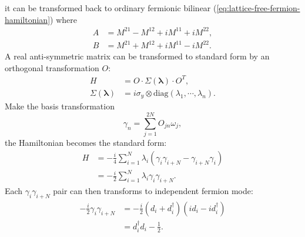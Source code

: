 it can be transformed back to ordinary fermionic bilinear (\ref{eq:lattice-free-fermion-hamiltonian}) where
\begin{equation}
\begin{aligned}
	A &= M^{21} - M^{12} + i M^{11} + i M^{22}, \\
	B &= M^{21} + M^{12} + i M^{11} - i M^{22}.
	\label{eq:lattice-majorana-bilinear-to-fermion}
\end{aligned}
\end{equation}
A real anti-symmetric matrix can be transformed to standard form by an orthogonal transformation $O$:
\begin{equation}
\begin{aligned}
	H &= O \cdot \Sigma(\bm \lambda) \cdot O^T, \\
	\Sigma(\bm \lambda) &= i\sigma_y \otimes \mathrm{diag}(\lambda_1,\cdots,\lambda_n).
\end{aligned}
\end{equation}
Make the basis transformation
\begin{equation}
	\gamma_n = \sum_{j=1}^{2N} O_{jn} \omega_j,
\end{equation}
the Hamiltonian becomes the standard form:
\begin{equation}
\begin{aligned}
	H &= -\frac{i}{4} \sum_{i=1}^N \lambda_i (\gamma_i \gamma_{i+N}-\gamma_{i+N} \gamma_i) \\
	&= -\frac{i}{2} \sum_{i=1}^N \lambda_i \gamma_i \gamma_{i+N}.
\end{aligned}
\end{equation}
Each $\gamma_i \gamma_{i+N}$ pair can then transforms to independent fermion mode:
\begin{equation}
\begin{aligned}
	-\frac{i}{2}\gamma_i \gamma_{i+N} 
	&= -\frac{i}{2}(d_i + d_i^\dagger)(id_i-id_i^\dagger) \\ 
	&= d_i^\dagger d_i-\frac{1}{2}.
\end{aligned}
\end{equation}



